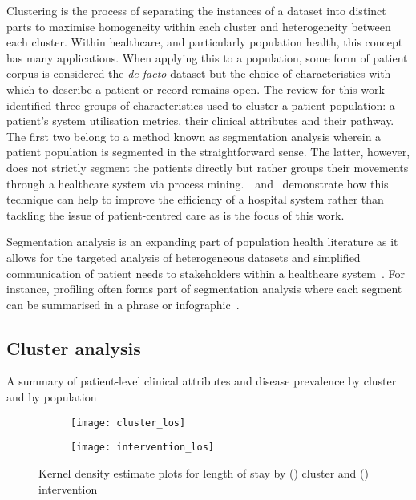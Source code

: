 Clustering is the process of separating the instances of a dataset into distinct
parts to maximise homogeneity within each cluster and heterogeneity between each
cluster. Within healthcare, and particularly population health, this concept has
many applications. When applying this to a population, some form of patient
corpus is considered the \emph{de facto} dataset but the choice of
characteristics with which to describe a patient or record remains open. The
review for this work identified three groups of characteristics used to cluster
a patient population: a patient's system utilisation metrics, their clinical
attributes and their pathway. The first two belong to a method known as
segmentation analysis wherein a patient population is segmented in the
straightforward sense. The latter, however, does not strictly segment the
patients directly but rather groups their movements through a healthcare system
via process mining.~\cite{AG2018}~and~\cite{DDGM+12015} demonstrate how this
technique can help to improve the efficiency of a hospital system rather than
tackling the issue of patient-centred care as is the focus of this work.

Segmentation analysis is an expanding part of population health literature as it
allows for the targeted analysis of heterogeneous datasets and simplified
communication of patient needs to stakeholders within a healthcare
system~\cite{VMD2016review, YKTT+12018}. For instance, profiling often forms
part of segmentation analysis where each segment can be summarised in a phrase
or infographic~\cite{VMD2016, YSKT+42019}.


\subsection{Cluster analysis}\label{subsec:clusters}

\begin{table}
    \centering
    \resizebox{\textwidth}{!}{%
        
    }\caption{A summary of patient-level clinical attributes and disease
    prevalence by cluster and by population}\label{tab:summary}
\end{table}

\begin{figure}
    \centering
    \begin{subfigure}{\halfimgwidth}
        \texttt{[image: cluster\_los]}
        \caption{}\label{fig:cluster_los}
    \end{subfigure}\hfill%
    \begin{subfigure}{\halfimgwidth}
        \texttt{[image: intervention\_los]}
        \caption{}\label{fig:intervention_los}
    \end{subfigure}
    \caption{%
        Kernel density estimate plots for length of stay by
        () cluster and ()
        intervention
    }\label{fig:los_kde}
\end{figure}

